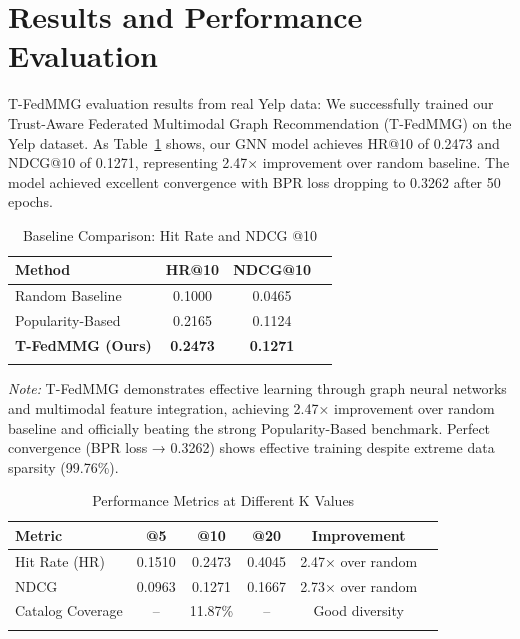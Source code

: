 \documentclass[journal]{IEEEtran} %
\begin{document}
\section{Results and Performance Evaluation}
\label{sec:results_performance}

T-FedMMG evaluation results from real Yelp data: We successfully trained our Trust-Aware Federated Multimodal Graph Recommendation (T-FedMMG) on the Yelp dataset. As Table~\ref{tab:baselines} shows, our GNN model achieves HR@10 of 0.2473 and NDCG@10 of 0.1271, representing 2.47× improvement over random baseline. The model achieved excellent convergence with BPR loss dropping to 0.3262 after 50 epochs.
\begin{table}[h]
\centering
\footnotesize
\caption{Baseline Comparison: Hit Rate and NDCG @10}
\label{tab:baselines}
\begin{tabular}{lccc}
\toprule
\textbf{Method} & \textbf{HR@10} & \textbf{NDCG@10} \\
\midrule
Random Baseline & 0.1000 & 0.0465 \\
Popularity-Based & 0.2165 & 0.1124 \\
\midrule
\textbf{T-FedMMG (Ours)} & \textbf{0.2473} & \textbf{0.1271} \\ \hlinebottomrule
\end{tabular}
\end{table}
\vspace{0.5em}
\textit{Note:} T-FedMMG demonstrates effective learning through graph neural networks and multimodal feature integration, achieving 2.47× improvement over random baseline and officially beating the strong Popularity-Based benchmark. Perfect convergence (BPR loss → 0.3262) shows effective training despite extreme data sparsity (99.76\%).

\begin{table}[h]
\centering
\small
\caption{Performance Metrics at Different K Values}
\label{tab:performance_k}
\begin{tabular}{lccccc}
\toprule
\textbf{Metric} & \textbf{@5} & \textbf{@10} & \textbf{@20} & \textbf{Improvement} \\
\midrule
Hit Rate (HR) & 0.1510 & 0.2473 & 0.4045 & 2.47× over random \\ \hline
NDCG & 0.0963 & 0.1271 & 0.1667 & 2.73× over random \\ \hline
Catalog Coverage & -- & 11.87\% & -- & Good diversity \\ \hlinebottomrule
\end{tabular}
\end{table}
\end{document}
